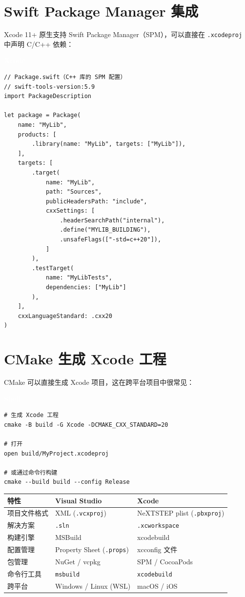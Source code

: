 \documentclass[12pt,a4paper,fontset=fandol]{ctexbook}
\newcommand{\Tp}[1]{\texttt{#1}}
\newcommand{\xcodelabel}{%
  \noindent\begin{tcolorbox}[sharp corners,colback=xcodeheadbg,colframe=xcodeheadbg,
    left=6pt,right=6pt,top=2pt,bottom=2pt,boxrule=0pt]
  \textcolor{white}{\small\bfseries\sffamily Xcode}\end{tcolorbox}%
}
\newcommand{\bashlabel}{%
  \noindent\begin{tcolorbox}[sharp corners,colback=cfgheadbg,colframe=cfgheadbg,
    left=6pt,right=6pt,top=2pt,bottom=2pt,boxrule=0pt]
  \textcolor{white}{\small\bfseries\sffamily Shell}\end{tcolorbox}%
}
\begin{document}
\section{Swift Package Manager 集成}

Xcode 11+ 原生支持 Swift Package Manager（SPM），可以直接在 \Tp{.xcodeproj} 中声明 C/C++ 依赖：

\xcodelabel
\begin{lstlisting}[style=bashstyle]
// Package.swift（C++ 库的 SPM 配置）
// swift-tools-version:5.9
import PackageDescription

let package = Package(
    name: "MyLib",
    products: [
        .library(name: "MyLib", targets: ["MyLib"]),
    ],
    targets: [
        .target(
            name: "MyLib",
            path: "Sources",
            publicHeadersPath: "include",
            cxxSettings: [
                .headerSearchPath("internal"),
                .define("MYLIB_BUILDING"),
                .unsafeFlags(["-std=c++20"]),
            ]
        ),
        .testTarget(
            name: "MyLibTests",
            dependencies: ["MyLib"]
        ),
    ],
    cxxLanguageStandard: .cxx20
)
\end{lstlisting}

\section{CMake 生成 Xcode 工程}

CMake 可以直接生成 Xcode 项目，这在跨平台项目中很常见：

\bashlabel
\begin{lstlisting}[style=bashstyle]
# 生成 Xcode 工程
cmake -B build -G Xcode -DCMAKE_CXX_STANDARD=20

# 打开
open build/MyProject.xcodeproj

# 或通过命令行构建
cmake --build build --config Release
\end{lstlisting}

\begin{compare}[title=VS 项目 vs Xcode 项目]
\begin{tabularx}{\textwidth}{lXX}
\toprule
\textbf{特性} & \textbf{Visual Studio} & \textbf{Xcode} \\
\midrule
项目文件格式 & XML (\Tp{.vcxproj}) & NeXTSTEP plist (\Tp{.pbxproj}) \\
解决方案 & \Tp{.sln} & \Tp{.xcworkspace} \\
构建引擎 & MSBuild & xcodebuild \\
配置管理 & Property Sheet (\Tp{.props}) & xcconfig 文件 \\
包管理 & NuGet / vcpkg & SPM / CocoaPods \\
命令行工具 & \Tp{msbuild} & \Tp{xcodebuild} \\
跨平台 & Windows / Linux (WSL) & macOS / iOS \\
\bottomrule
\end{tabularx}
\end{compare}
\end{document}
